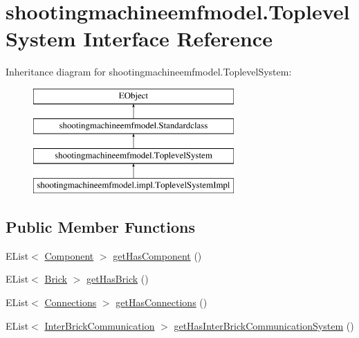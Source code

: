 \hypertarget{interfaceshootingmachineemfmodel_1_1_toplevel_system}{\section{shootingmachineemfmodel.\-Toplevel\-System Interface Reference}
\label{interfaceshootingmachineemfmodel_1_1_toplevel_system}
}
Inheritance diagram for shootingmachineemfmodel.\-Toplevel\-System\-:\begin{figure}[H]
\begin{center}
\leavevmode
\includegraphics[height=4.000000cm]{interfaceshootingmachineemfmodel_1_1_toplevel_system}
\end{center}
\end{figure}
\subsection*{Public Member Functions}
\begin{DoxyCompactItemize}
\item 
E\-List$<$ \hyperlink{interfaceshootingmachineemfmodel_1_1_component}{Component} $>$ \hyperlink{interfaceshootingmachineemfmodel_1_1_toplevel_system_a96e244e1b9d286ee56bf2a88c5098924}{get\-Has\-Component} ()
\item 
E\-List$<$ \hyperlink{interfaceshootingmachineemfmodel_1_1_brick}{Brick} $>$ \hyperlink{interfaceshootingmachineemfmodel_1_1_toplevel_system_af382beaedd018021495de92d02553558}{get\-Has\-Brick} ()
\item 
E\-List$<$ \hyperlink{interfaceshootingmachineemfmodel_1_1_connections}{Connections} $>$ \hyperlink{interfaceshootingmachineemfmodel_1_1_toplevel_system_ae022356fb761fb061939a22136763dcb}{get\-Has\-Connections} ()
\item 
E\-List$<$ \hyperlink{interfaceshootingmachineemfmodel_1_1_inter_brick_communication}{Inter\-Brick\-Communication} $>$ \hyperlink{interfaceshootingmachineemfmodel_1_1_toplevel_system_a726fd2a00e14ba3779bafe6e2427df66}{get\-Has\-Inter\-Brick\-Communication\-System} ()
\end{DoxyCompactItemize}


